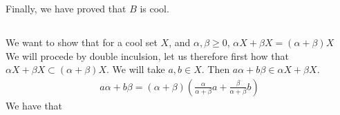 \documentclass{article}
\begin{document}
\noindent Finally, we have proved that $B$ is cool.


\subsection{}
We want to show that for a cool set $X$, and $\alpha,\beta \geq 0, \, \alpha X + \beta X = (\alpha + \beta )X$\\
We will procede by double inculsion, let us therefore first how that $\alpha X + \beta X \subset (\alpha + \beta )X$. We will take $a,b \in X$. Then $a\alpha + b\beta \in  \alpha X + \beta X$.
\begin{align*}
	a\alpha + b\beta = (\alpha + \beta )\left( \frac{\alpha}{\alpha + \beta}a +  \frac{\beta}{\alpha + \beta}b \right)
\end{align*}
We have that 

 






\end{document}
